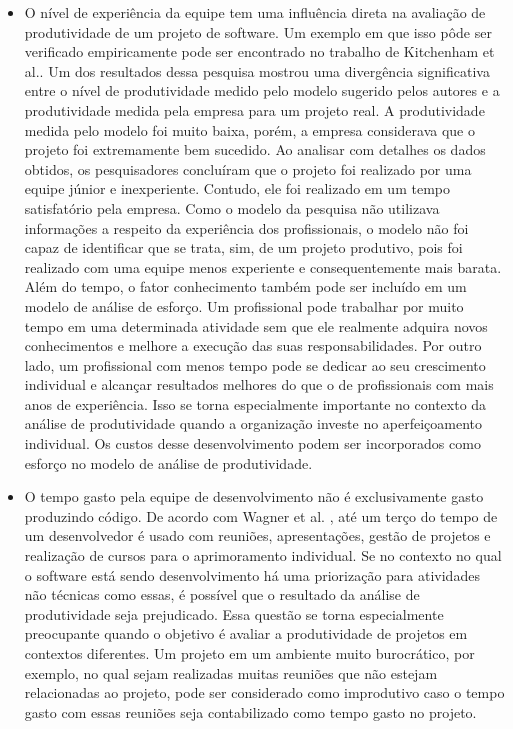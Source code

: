 \begin{itemize}
\item O nível de experiência  da equipe tem uma influência direta na avaliação de produtividade de um projeto de software.  Um exemplo em que isso pôde ser verificado empiricamente pode ser encontrado no trabalho de Kitchenham et al.\cite{kitchenham2004software}. Um dos resultados dessa pesquisa mostrou uma divergência significativa entre o nível de produtividade medido pelo modelo sugerido pelos autores e a produtividade medida pela empresa para um projeto real. A produtividade medida pelo modelo foi muito baixa, porém, a empresa considerava que o projeto foi  extremamente bem sucedido. Ao analisar com detalhes os dados obtidos, os pesquisadores concluíram que o projeto foi realizado por uma equipe júnior e inexperiente. Contudo, ele foi realizado em um tempo satisfatório pela empresa. Como o modelo da pesquisa não utilizava informações a respeito da experiência dos profissionais, o modelo não foi capaz de identificar que se trata,  sim, de um projeto produtivo, pois foi realizado com uma equipe menos experiente e consequentemente mais barata. 
Além do tempo, o fator conhecimento também pode ser incluído em um modelo de análise de esforço. Um profissional pode trabalhar por muito tempo em uma determinada atividade sem que ele realmente adquira novos conhecimentos e melhore a execução das suas responsabilidades. Por outro lado, um profissional com menos tempo pode se dedicar ao seu crescimento individual e alcançar resultados melhores do que o de profissionais com mais anos de experiência. Isso se torna especialmente importante no contexto da análise de produtividade quando a organização investe no aperfeiçoamento individual. Os custos desse desenvolvimento podem ser incorporados como esforço no modelo de análise de produtividade.
\item O tempo gasto pela equipe de desenvolvimento não é exclusivamente gasto produzindo código. De acordo com Wagner et al. \cite{wagner2018systematic}, até um terço do tempo de um  desenvolvedor é  usado com reuniões, apresentações, gestão de projetos e realização de cursos para o aprimoramento individual. Se no contexto no qual o software está sendo desenvolvimento há uma priorização para atividades não técnicas como essas, é possível que o resultado da análise de produtividade seja prejudicado. Essa questão se torna especialmente preocupante quando o objetivo é avaliar a produtividade de projetos em contextos diferentes. Um projeto em um ambiente muito burocrático, por exemplo, no qual sejam realizadas muitas reuniões que não estejam relacionadas ao projeto, pode ser considerado como improdutivo caso o tempo gasto com essas reuniões seja contabilizado como tempo gasto no projeto.


\end{itemize}
